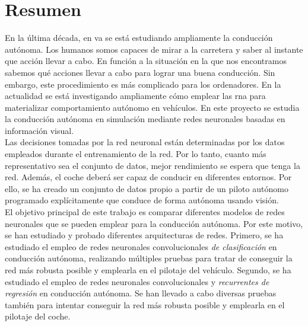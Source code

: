 \chapter*{Resumen}

En la última década, en \acrfull{va} se está estudiando ampliamente la conducción autónoma. Los humanos somos capaces de mirar a la carretera y saber al instante que acción llevar a cabo. En función a la situación en la que nos encontramos sabemos qué acciones llevar a cabo para lograr una buena conducción.  Sin embargo, este procedimiento es más complicado para los ordenadores. En la actualidad se está investigando ampliamente cómo emplear las \acrfull{rna} para materializar comportamiento autónomo en vehículos. En este proyecto se estudia la conducción autónoma en simulación mediante redes neuronales basadas en información visual.\\

Las decisiones tomadas por la red neuronal están determinadas por los datos empleados durante el entrenamiento de la red. Por lo tanto, cuanto más representativo sea el conjunto de datos, mejor rendimiento se espera que tenga la red. Además, el coche deberá ser capaz de conducir en diferentes entornos. Por ello, se ha creado un conjunto de datos propio a partir de un piloto autónomo programado explícitamente que conduce de forma autónoma usando visión.\\


El objetivo principal de este trabajo es comparar diferentes modelos de redes neuronales que se pueden emplear para la conducción autónoma. Por este motivo, se han estudiado y probado diferentes arquitecturas de redes. Primero, se ha estudiado el empleo de redes neuronales convolucionales \textit{de clasificación} en conducción autónoma, realizando múltiples pruebas para tratar de conseguir la red más robusta posible y emplearla en el pilotaje del vehículo. Segundo, se ha estudiado el empleo de redes neuronales convolucionales y \textit{recurrentes de regresión} en conducción autónoma. Se han llevado a cabo diversas pruebas también para intentar conseguir la red más robusta posible y emplearla en el pilotaje del coche.